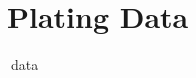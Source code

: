 \chapter{Plating Data}
\label{ch:plating_data}
\newpage
\thispagestyle{lscape}
\pagestyle{lscape}
\begin{landscape}
    ^^^data
\end{landscape}
\thispagestyle{normal}
\pagestyle{normal}